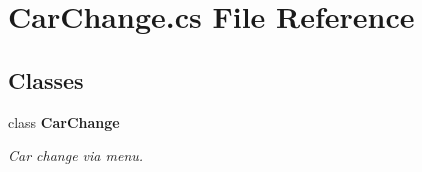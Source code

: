 \section{Car\+Change.\+cs File Reference}
\label{_car_change_8cs}
\subsection*{Classes}
\begin{DoxyCompactItemize}
\item 
class {\bf Car\+Change}
\begin{DoxyCompactList}\small\item\em Car change via menu. \end{DoxyCompactList}\end{DoxyCompactItemize}
